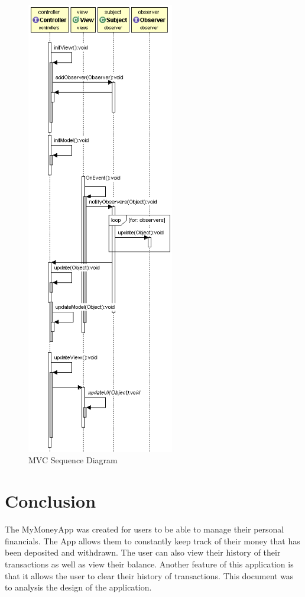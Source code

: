 \documentclass[12pt]{article}
\begin{document}
\begin{figure}[h!]
  \centering
  \includegraphics[height=200mm]{mvc_sequence.png}
  \caption{MVC Sequence Diagram}
\end{figure}
\vspace*{-0.5in}
\clearpage

\section{Conclusion}
The MyMoneyApp was created for users to be able to manage their personal financials. The App allows them to constantly keep track of their money that has been deposited and withdrawn. The user can also view their history of their transactions as well as view their balance. Another feature of this application is that it allows the user to clear their history of transactions. This document was to analysis the design of the application.
\end{document}
